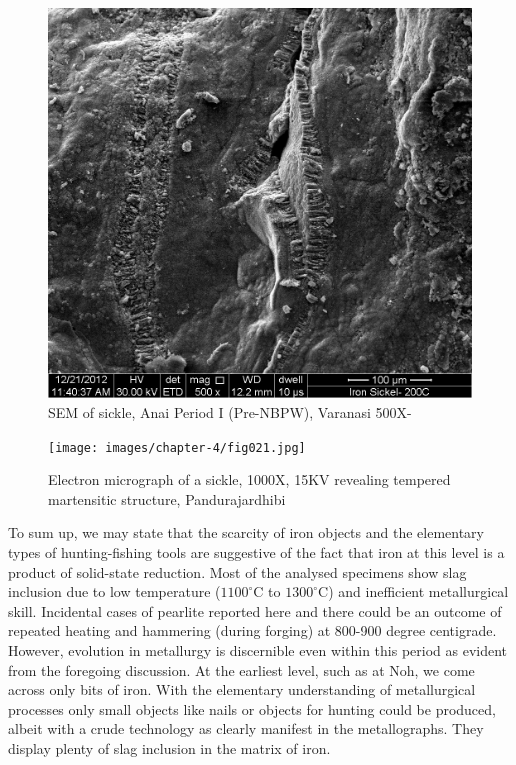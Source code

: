 \newpage

\begin{figure}[H]
\setcounter{figure}{19}
\includegraphics[scale=1]{images/chapter-4/fig020.jpg}
\caption{SEM of sickle, Anai Period I (Pre-NBPW), Varanasi 500X-}\label{chapter-4-fig20}
\end{figure}

\begin{figure}[H]
\texttt{[image: images/chapter-4/fig021.jpg]}
\caption{Electron micrograph of a sickle, 1000X, 15KV revealing tempered martensitic structure, Pandurajardhibi }\label{chapter-4-fig21}
\end{figure}


\newpage

To sum up, we may state that the scarcity of iron objects and the elementary types of hunting-fishing tools are suggestive of the fact that iron at this level is a product of solid-state reduction. Most of the analysed specimens show slag inclusion due to low temperature ($1100^{\circ}$C to $1300^{\circ}$C) and inefficient metallurgical skill. Incidental cases of pearlite reported here and there could be an outcome of repeated heating and hammering (during forging) at 800-900 degree centigrade. However, evolution in metallurgy is discernible even within this period as evident from the foregoing discussion. At the earliest level, such as at Noh, we come across only bits of iron. With the elementary understanding of metallurgical processes only small objects like nails or objects for hunting could be produced, albeit with a crude technology as clearly manifest in the metallographs. They display plenty of slag inclusion in the matrix of iron.

